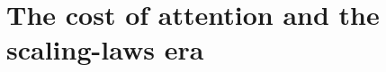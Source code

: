 \setcounter{tocdepth}{1}
\chapter{The cost of attention and the scaling-laws era}
\label{ch:cost-and-scaling}




\setcounter{tocdepth}{2}
